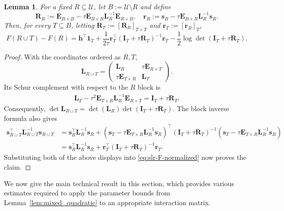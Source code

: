 \documentclass[11pt]{article}
\newtheorem{lemma}{Lemma}
\newcommand{\defeq}{:=}
\newcommand{\1}{\mathbf{1}}
\newcommand{\0}{\mathbf{0}}
\newcommand{\id}{\mathbf{I}}
\newcommand{\vone}{\mathbf{1}}
\newcommand{\me}{{\mathbf{E}}}
\newcommand{\ml}{{\mathbf{L}}}
\newcommand{\mr}{{\mathbf{R}}}
\newcommand{\vh}{{\mathbf{h}}}
\newcommand{\vr}{{\mathbf{r}}}
\newcommand{\vs}{{\mathbf{s}}}
\newcommand{\calU}{{\mathcal{U}}}
\begin{document}
\begin{lemma}
\label{lem:slr-schur-reduction}
For a fixed $R \subseteq \calU$, let $B \defeq \calU\setminus R$ and define
\begin{equation}\label{eq:rdef}
    \mr_R
    \defeq
    \me_{B\times B}
    -
    \tau\me_{B\times R}\ml_R^{-1}\me_{R\times B},
    \quad
    \vr_R
    \defeq
    \vs_B
    -
    \tau\me_{B\times R}\ml_R^{-1}\vs_R.
\end{equation}
Then, for every $T\subseteq B$, letting $\mr_T \defeq [\mr_R]_{T\times T}$ and $\vr_T \defeq [\vr_R]_T$,
\[
    F(R\cup T)-F(R)
    =
    \vh^\top\vone_T
    +
    \frac{1}{2\tau}
    \vr_T^\top
    \left(\id_T+\tau\mr_T\right)^{-1}
    \vr_T
    -
    \frac12
    \log\det\left(\id_T+\tau\mr_T\right).
\]
\end{lemma}

\begin{proof}
With the coordinates ordered as $R,T$,
\[
    \ml_{R\cup T}
    =
    \begin{pmatrix}
        \ml_R & \tau\me_{R\times T}\\
        \tau\me_{T\times R} & \ml_T
    \end{pmatrix}.
\]
Its Schur complement with respect to the $R$ block is
\[
\begin{aligned}
    \ml_T
    -
    \tau^2\me_{T\times R}\ml_R^{-1}\me_{R\times T}=
    \id_T+\tau\mr_T.
\end{aligned}
\]
Consequently,
$\det\ml_{R\cup T}
    =
    \det(\ml_R)
    \det\left(\id_T+\tau\mr_T\right)$.
The block inverse formula also gives
\[
\begin{aligned}
    \vs_{R\cup T}^\top\ml_{R\cup T}^{-1}\vs_{R\cup T}
    &=
    \vs_R^\top\ml_R^{-1}\vs_R+
    \left(
        \vs_T
        -
        \tau\me_{T\times R}\ml_R^{-1}\vs_R
    \right)^\top
    \left(\id_T+\tau\mr_T\right)^{-1}
    \left(
        \vs_T
        -
        \tau\me_{T\times R}\ml_R^{-1}\vs_R
    \right)\\
    &=
    \vs_R^\top\ml_R^{-1}\vs_R
    +
    \vr_T^\top
    \left(\id_T+\tau\mr_T\right)^{-1}
    \vr_T.
\end{aligned}
\]
Substituting both of the above displays into \eqref{eq:slr-F-normalized} now proves the claim.
\end{proof}

We now give the main technical result in this section, which provides various estimates required to apply the parameter bounds from Lemma~\ref{lem:mixed_quadratic} to an appropriate interaction matrix.
\end{document}
